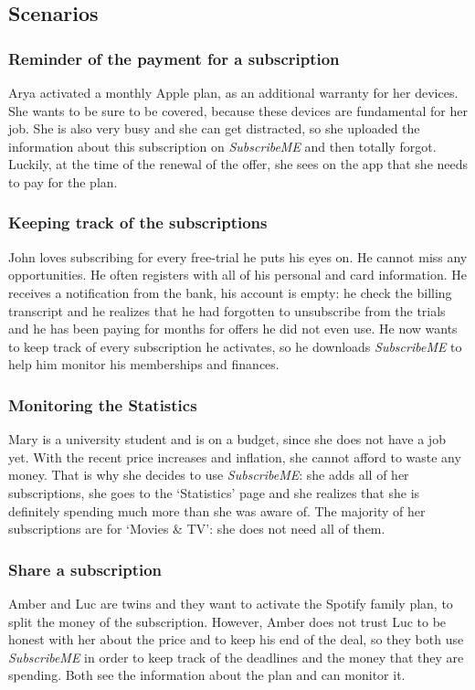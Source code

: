 \documentclass[12pt]{article}
\begin{document}
\subsection{Scenarios}\label{sub:scenarios}
\subsubsection{Reminder of the payment for a subscription}
Arya activated a monthly Apple plan, as an additional warranty for her devices. She wants to be sure to be covered, because these devices are fundamental for her job. She is also very busy and she can get distracted, so she uploaded the information about this subscription on \textit{SubscribeME} and then totally forgot. Luckily, at the time of the renewal of the offer, she sees on the app that she needs to pay for the plan.

\subsubsection{Keeping track of the subscriptions}
John loves subscribing for every free-trial he puts his eyes on. He cannot miss any opportunities. He often registers with all of his personal and card information. He receives a notification from the bank, his account is empty: he check the billing transcript and he realizes that he had forgotten to unsubscribe from the trials and he has been paying for months for offers he did not even use. He now wants to keep track of every subscription he activates, so he downloads \textit{SubscribeME} to help him monitor his memberships and finances.

\subsubsection{Monitoring the Statistics}
Mary is a university student and is on a budget, since she does not have a job yet. With the recent price increases and inflation, she cannot afford to waste any money. That is why she decides to use \textit{SubscribeME}: she adds all of her subscriptions, she goes to the `Statistics' page and she realizes that she is definitely spending much more than she was aware of. The majority of her subscriptions are for `Movies \& TV': she does not need all of them.

\subsubsection{Share a subscription}
Amber and Luc are twins and they want to activate the Spotify family plan, to split the money of the subscription. However, Amber does not trust Luc to be honest with her about the price and to keep his end of the deal, so they both use \textit{SubscribeME} in order to keep track of the deadlines and the money that they are spending. Both see the information about the plan and can monitor it.
\end{document}
